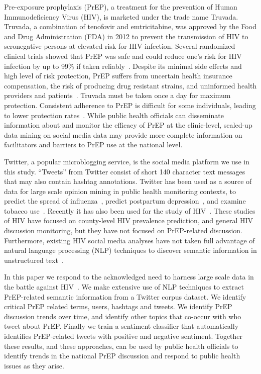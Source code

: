 \documentclass[conference]{IEEEtran}
\begin{document}
Pre-exposure prophylaxis (PrEP), a treatment for the prevention of Human Immunodeficiency Virus (HIV), is marketed under the trade name Truvada. Truvada, a combination of tenofovir and emtricitabine, was approved by the Food and Drug Administration (FDA) in 2012 to prevent the transmission of HIV to seronegative persons at elevated risk for HIV infection. Several randomized clinical trials showed that PrEP was safe and could reduce one's risk for HIV infection by up to 99\% if taken reliably~\cite{grant2010preexposure,thigpen2012antiretroviral}. Despite its minimal side effects and high level of risk protection, PrEP suffers from uncertain health insurance compensation, the risk of producing drug resistant strains, and uninformed health providers and patients~\cite{liu2014early}. Truvada must be taken once a day for maximum protection. Consistent adherence to PrEP is difficult for some individuals, leading to lower protection rates~\cite{van2012unraveling}. While public health officials can disseminate information about and monitor the efficacy of PrEP at the clinic-level, scaled-up data mining on social media data may provide more complete information on facilitators and barriers to PrEP use at the national level.

Twitter, a popular microblogging service, is the social media platform we use in this study. ``Tweets'' from Twitter consist of short 140 character text messages that may also contain hashtag annotations. Twitter has been used as a source of data for large scale opinion mining in public health monitoring contexts, to predict the spread of influenza~\cite{aramaki2011twitter}, predict postpartum depression~\cite{de2013predicting}, and examine tobacco use~\cite{myslin2013using}. Recently it has also been used for the study of HIV~\cite{young2014methods,young2013online}. These studies of HIV have focused on county-level HIV prevalence prediction, and general HIV discussion monitoring, but they have not focused on PrEP-related discussion. Furthermore, existing HIV social media analyses have not taken full advantage of natural language processing (NLP) techniques to discover semantic information in unstructured text~\cite{young2015big}.

In this paper we respond to the acknowledged need to harness large scale data in the battle against HIV~\cite{young2015big}. We make extensive use of NLP techniques to extract PrEP-related semantic information from a Twitter corpus dataset. We identify critical PrEP related terms, users, hashtags and tweets. We identify PrEP discussion trends over time, and identify other topics that co-occur with who tweet about PrEP. Finally we train a sentiment classifier that automatically identifies PrEP-related tweets with positive and negative sentiment. Together these results, and these approaches, can be used by public health officials to identify trends in the national PrEP discussion and respond to public health issues as they arise.
\end{document}
